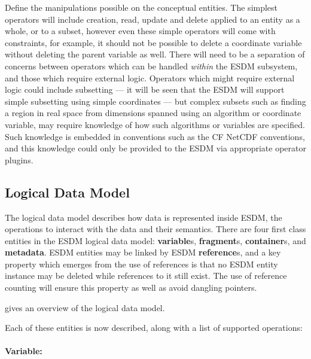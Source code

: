 Define the manipulations possible on the conceptual entities. The
simplest operators will include creation, read, update and delete
applied to an entity as a whole, or to a subset, however even these
simple operators will come with constraints, for example, it should not
be possible to delete a coordinate variable without deleting the parent
variable as well. There will need to be a separation of concerns between
operators which can be handled \emph{within} the ESDM subsystem, and
those which require external logic. Operators which might require
external logic could include subsetting --- it will be seen that the
ESDM will support simple subsetting using simple coordinates --- but
complex subsets such as finding a region in real space from dimensions
spanned using an algorithm or coordinate variable, may require knowledge
of how such algorithms or variables are specified. Such knowledge is
embedded in conventions such as the CF NetCDF conventions, and this
knowledge could only be provided to the ESDM via appropriate operator
plugins.

\subsection{Logical Data Model}

The logical data model describes how data is represented inside ESDM,
the operations to interact with the data and their semantics. There are
four first class entities in the ESDM logical data model:
\textbf{variable}s, \textbf{fragment}s, \textbf{container}s, and
\textbf{metadata}. ESDM entities may be linked by ESDM
\textbf{reference}s, and a key property which emerges from the use of
references is that no ESDM entity instance may be deleted while
references to it still exist. The use of reference counting will ensure
this property as well as avoid dangling pointers.

gives an overview of the logical data model.

Each of these entities is now described, along with a list of supported
operations:

\paragraph{Variable:}%
\label{variable-1}

